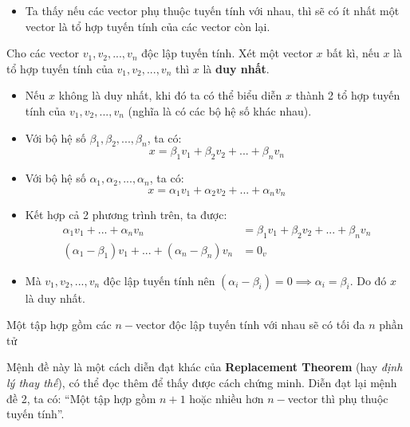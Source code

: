 \begin{itemize}
    \item Ta thấy nếu các vector phụ thuộc tuyến tính với nhau, thì sẽ có ít nhất một vector là tổ hợp tuyến tính của các vector còn lại.
\end{itemize}

\begin{propvn}
    Cho các vector $v_1, v_2, ..., v_n$ độc lập tuyến tính. Xét một vector $x$ bất kì, nếu $x$ là tổ hợp tuyến tính của $v_1, v_2, ..., v_n$ thì $x$ là \textbf{duy nhất}.
\end{propvn}
\begin{proofvn} \vphantom{}
    \begin{itemize}
        \item Nếu $x$ không là duy nhất, khi đó ta có thể biểu diễn $x$ thành 2 tổ hợp tuyến tính của $v_1, v_2, ..., v_n$ (nghĩa là có các bộ hệ số khác nhau).
        
        \item Với bộ hệ số $\beta_1, \beta_2, ..., \beta_n$, ta có:
        $$
        x = \beta_1 v_1 + \beta_2 v_2 + ... + \beta_n v_n
        $$

        \item Với bộ hệ số $\alpha_1, \alpha_2, ..., \alpha_n$, ta có:
        $$
        x = \alpha_1 v_1 + \alpha_2 v_2 + ... + \alpha_n v_n
        $$

        \item Kết hợp cả 2 phương trình trên, ta được:
        $$
        \begin{aligned}
        \alpha_1 v_1 + ... + \alpha_n v_n &= \beta_1 v_1 + \beta_2 v_2 + ... + \beta_n v_n \\
        (\alpha_1 - \beta_1)v_1 + ... + (\alpha_n - \beta_n)v_n &= 0_{v}
        \end{aligned}
        $$

        \item Mà $v_1, v_2, ..., v_n$ độc lập tuyến tính nên $(\alpha_i - \beta_i) = 0 \implies \alpha_i = \beta_i$. Do đó $x$ là duy nhất.
    \end{itemize}
\end{proofvn}

\begin{propvn}
    Một tập hợp gồm các $n-$vector độc lập tuyến tính với nhau sẽ có tối đa $n$ phần tử
\end{propvn}
\begin{proofvn}
    Mệnh đề này là một cách diễn đạt khác của \textbf{Replacement Theorem} (hay \textit{định lý thay thế}), có thể đọc thêm để thấy được cách chứng minh. Diễn đạt lại mệnh đề 2, ta có: ``Một tập hợp gồm $n+1$ hoặc nhiều hơn $n-$vector thì phụ thuộc tuyến tính''.
\end{proofvn}

\begin{defivn} 
\end{defivn}